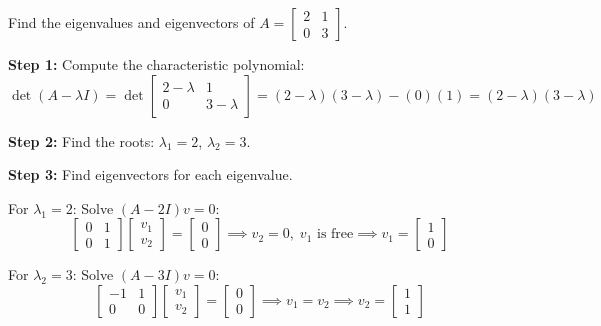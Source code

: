\documentclass[11pt]{article}
\theoremstyle{definition}
\theoremstyle{plain}
\theoremstyle{remark}
\begin{document}
\begin{workedexample}[title=\textbf{Worked Example: Finding eigenvalues and eigenvectors}]
Find the eigenvalues and eigenvectors of $A = \begin{bmatrix}2 & 1\\0 & 3\end{bmatrix}$.

\textbf{Step 1:} Compute the characteristic polynomial:
\[
\det(A - \lambda I) = \det\begin{bmatrix}2-\lambda & 1\\0 & 3-\lambda\end{bmatrix} = (2-\lambda)(3-\lambda) - (0)(1) = (2-\lambda)(3-\lambda)
\]

\textbf{Step 2:} Find the roots: $\lambda_1 = 2$, $\lambda_2 = 3$.

\textbf{Step 3:} Find eigenvectors for each eigenvalue.

For $\lambda_1 = 2$: Solve $(A - 2I)v = 0$:
\[
\begin{bmatrix}0 & 1\\0 & 1\end{bmatrix}\begin{bmatrix}v_1\\v_2\end{bmatrix} = \begin{bmatrix}0\\0\end{bmatrix} \implies v_2 = 0, \; v_1 \text{ is free} \implies v_1 = \begin{bmatrix}1\\0\end{bmatrix}
\]

For $\lambda_2 = 3$: Solve $(A - 3I)v = 0$:
\[
\begin{bmatrix}-1 & 1\\0 & 0\end{bmatrix}\begin{bmatrix}v_1\\v_2\end{bmatrix} = \begin{bmatrix}0\\0\end{bmatrix} \implies v_1 = v_2 \implies v_2 = \begin{bmatrix}1\\1\end{bmatrix}
\]


\end{workedexample}
\end{document}
